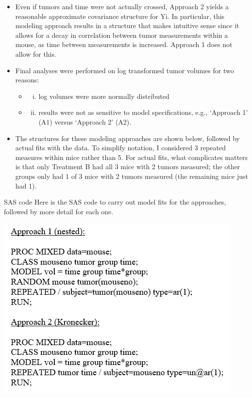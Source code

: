 \documentclass[
  9pt,
  ignorenonframetext,
]{beamer}
\providecommand{\tightlist}{%
  \setlength{\itemsep}{0pt}\setlength{\parskip}{0pt}}
\begin{document}
\begin{frame}{}
\protect\hypertarget{section-2}{}
\begin{itemize}
\item
  Even if tumors and time were not actually crossed, Approach 2 yields a
  reasonable approximate covariance structure for Yi. In particular,
  this modeling approach results in a structure that makes intuitive
  sense since it allows for a decay in correlation between tumor
  measurements within a mouse, as time between measurements is
  increased. Approach 1 does not allow for this.
\item
  Final analyses were performed on log transformed tumor volumes for two
  reasons:

  \begin{itemize}
  \item
    \begin{enumerate}
    [(i)]
    \tightlist
    \item
      log volumes were more normally distributed
    \end{enumerate}
  \item
    \begin{enumerate}
    [(i)]
    \setcounter{enumi}{1}
    \tightlist
    \item
      results were not as sensitive to model specifications, e.g.,
      `Approach 1' (A1) versus `Approach 2' (A2).
    \end{enumerate}
  \end{itemize}
\item
  The structures for these modeling approaches are shown below, followed
  by actual fits with the data. To simplify notation, I considered 3
  repeated measures within mice rather than 5. For actual fits, what
  complicates matters is that only Treatment B had all 3 mice with 2
  tumors measured; the other groups only had 1 of 3 mice with 2 tumors
  measured (the remaining mice just had 1).
\end{itemize}
\end{frame}

\begin{frame}{SAS code}
\protect\hypertarget{sas-code}{}
Here is the SAS code to carry out model fits for the approaches,
followed by more detail for each one.

\begin{center}\includegraphics[width=0.7\linewidth]{figs_L11/f1} \end{center}
\end{frame}
\end{document}
